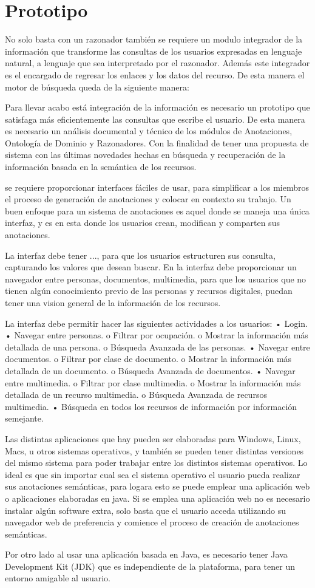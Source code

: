 \chapter{Prototipo}
\label{cap:piu}
No solo basta con un razonador también se requiere un modulo integrador de la información que transforme las consultas de los usuarios expresadas en lenguaje natural, a lenguaje que sea interpretado por el razonador. Además este integrador es el encargado de regresar los enlaces y los datos del recurso. De esta manera el motor de búsqueda queda de la siguiente manera:

Para llevar acabo está integración de la información es necesario un prototipo que satisfaga más eficientemente las consultas que escribe el usuario. De esta manera es necesario un análisis documental y técnico de los módulos de Anotaciones, Ontología de Dominio y Razonadores. Con la finalidad de tener una propuesta de sistema con las últimas novedades hechas en búsqueda y recuperación de la información basada en la semántica de los recursos.

se requiere proporcionar interfaces fáciles de usar, para simplificar a los miembros el proceso de generación de anotaciones y colocar en contexto su trabajo.  Un buen enfoque para un sistema de anotaciones es aquel donde se maneja una única interfaz, y es en esta donde los usuarios crean, modifican y comparten sus anotaciones.

La interfaz debe tener ..., para que los usuarios estructuren sus consulta, capturando los valores que desean buscar. En la interfaz debe proporcionar un navegador entre personas, documentos, multimedia, para que los usuarios que no tienen algún conocimiento previo de las personas y recursos digitales, puedan tener una vision general de la información de los recursos.

La interfaz debe permitir hacer las siguientes actividades a los usuarios:
•	Login.
•	Navegar entre personas.
o	Filtrar por ocupación.
o	Mostrar la información más detallada de una persona.
o	Búsqueda Avanzada de las personas.
•	Navegar entre documentos.
o	Filtrar por clase de documento.
o	Mostrar la información más detallada de un documento.
o	Búsqueda Avanzada de documentos.
•	Navegar entre multimedia.
o	Filtrar por clase multimedia.
o	Mostrar la información más detallada de un recurso multimedia.
o	Búsqueda Avanzada de recursos multimedia.
•	Búsqueda en todos los recursos de información por información semejante.

Las distintas aplicaciones que hay pueden ser elaboradas para Windows, Linux, Macs, u otros sistemas operativos, y también se pueden tener distintas versiones del mismo sistema para poder trabajar entre los distintos sistemas operativos. Lo ideal es que sin importar cual sea el sistema operativo el usuario pueda realizar sus anotaciones semánticas, para logara esto se puede emplear una aplicación web o aplicaciones elaboradas en java.
Si se emplea una aplicación web no es necesario instalar algún software extra, solo basta que el usuario acceda utilizando su navegador web de preferencia y comience el proceso de creación de anotaciones semánticas.

Por otro lado al usar una aplicación basada en Java, es necesario tener Java Development Kit (JDK) que es independiente de la plataforma, para tener un entorno amigable al usuario.

